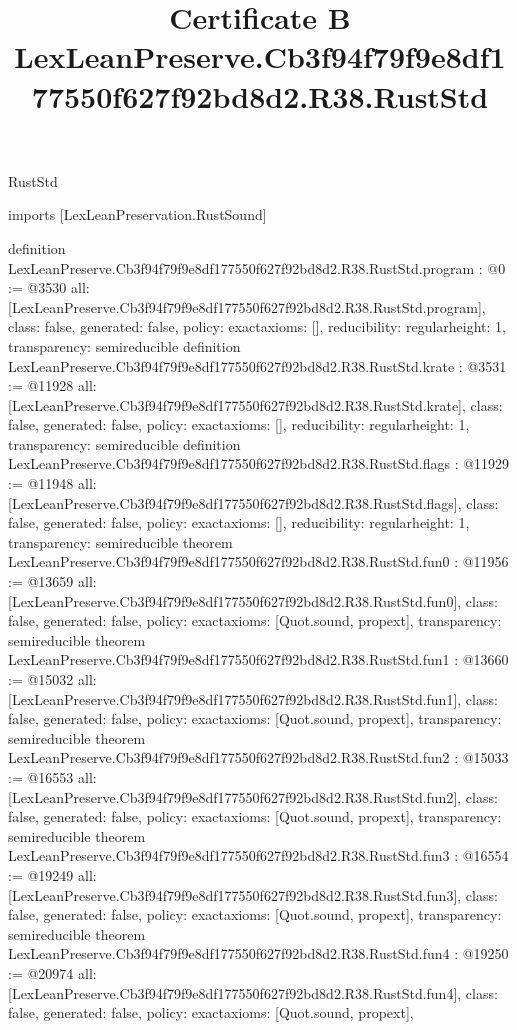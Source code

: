 \begin{lexlean}{RustStd}
\title{Certificate B LexLeanPreserve.Cb3f94f79f9e8df177550f627f92bd8d2.R38.RustStd}
\begin{coremodule}
imports [LexLeanPreservation.RustSound]

definition LexLeanPreserve.Cb3f94f79f9e8df177550f627f92bd8d2.R38.RustStd.program : @0 := @3530 {
  all: [LexLeanPreserve.Cb3f94f79f9e8df177550f627f92bd8d2.R38.RustStd.program],
  class: false,
  generated: false,
  policy: exact{axioms: []},
  reducibility: regular{height: 1},
  transparency: semireducible
}
definition LexLeanPreserve.Cb3f94f79f9e8df177550f627f92bd8d2.R38.RustStd.krate : @3531 := @11928 {
  all: [LexLeanPreserve.Cb3f94f79f9e8df177550f627f92bd8d2.R38.RustStd.krate],
  class: false,
  generated: false,
  policy: exact{axioms: []},
  reducibility: regular{height: 1},
  transparency: semireducible
}
definition LexLeanPreserve.Cb3f94f79f9e8df177550f627f92bd8d2.R38.RustStd.flags : @11929 := @11948 {
  all: [LexLeanPreserve.Cb3f94f79f9e8df177550f627f92bd8d2.R38.RustStd.flags],
  class: false,
  generated: false,
  policy: exact{axioms: []},
  reducibility: regular{height: 1},
  transparency: semireducible
}
theorem LexLeanPreserve.Cb3f94f79f9e8df177550f627f92bd8d2.R38.RustStd.fun0 : @11956 := @13659 {
  all: [LexLeanPreserve.Cb3f94f79f9e8df177550f627f92bd8d2.R38.RustStd.fun0],
  class: false,
  generated: false,
  policy: exact{axioms: [Quot.sound, propext]},
  transparency: semireducible
}
theorem LexLeanPreserve.Cb3f94f79f9e8df177550f627f92bd8d2.R38.RustStd.fun1 : @13660 := @15032 {
  all: [LexLeanPreserve.Cb3f94f79f9e8df177550f627f92bd8d2.R38.RustStd.fun1],
  class: false,
  generated: false,
  policy: exact{axioms: [Quot.sound, propext]},
  transparency: semireducible
}
theorem LexLeanPreserve.Cb3f94f79f9e8df177550f627f92bd8d2.R38.RustStd.fun2 : @15033 := @16553 {
  all: [LexLeanPreserve.Cb3f94f79f9e8df177550f627f92bd8d2.R38.RustStd.fun2],
  class: false,
  generated: false,
  policy: exact{axioms: [Quot.sound, propext]},
  transparency: semireducible
}
theorem LexLeanPreserve.Cb3f94f79f9e8df177550f627f92bd8d2.R38.RustStd.fun3 : @16554 := @19249 {
  all: [LexLeanPreserve.Cb3f94f79f9e8df177550f627f92bd8d2.R38.RustStd.fun3],
  class: false,
  generated: false,
  policy: exact{axioms: [Quot.sound, propext]},
  transparency: semireducible
}
theorem LexLeanPreserve.Cb3f94f79f9e8df177550f627f92bd8d2.R38.RustStd.fun4 : @19250 := @20974 {
  all: [LexLeanPreserve.Cb3f94f79f9e8df177550f627f92bd8d2.R38.RustStd.fun4],
  class: false,
  generated: false,
  policy: exact{axioms: [Quot.sound, propext]},
}
\end{coremodule}
\end{lexlean}
